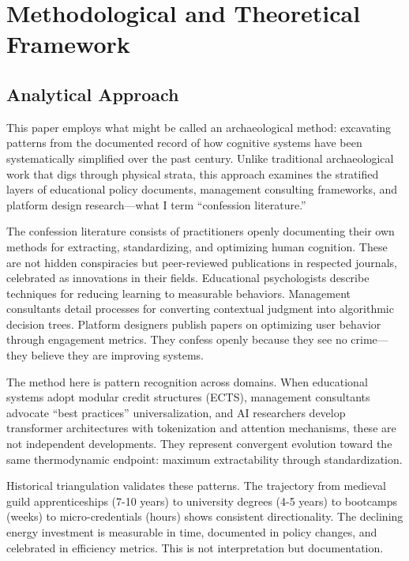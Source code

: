 \section{Methodological and Theoretical Framework}

\subsection{Analytical Approach}

This paper employs what might be called an archaeological method: excavating patterns from the documented record of how cognitive systems have been systematically simplified over the past century. Unlike traditional archaeological work that digs through physical strata, this approach examines the stratified layers of educational policy documents, management consulting frameworks, and platform design research---what I term ``confession literature.''

The confession literature consists of practitioners openly documenting their own methods for extracting, standardizing, and optimizing human cognition. These are not hidden conspiracies but peer-reviewed publications in respected journals, celebrated as innovations in their fields. Educational psychologists describe techniques for reducing learning to measurable behaviors. Management consultants detail processes for converting contextual judgment into algorithmic decision trees. Platform designers publish papers on optimizing user behavior through engagement metrics. They confess openly because they see no crime---they believe they are improving systems.

The method here is pattern recognition across domains. When educational systems adopt modular credit structures (ECTS), management consultants advocate ``best practices'' universalization, and AI researchers develop transformer architectures with tokenization and attention mechanisms, these are not independent developments. They represent convergent evolution toward the same thermodynamic endpoint: maximum extractability through standardization.

Historical triangulation validates these patterns. The trajectory from medieval guild apprenticeships (7-10 years) to university degrees (4-5 years) to bootcamps (weeks) to micro-credentials (hours) shows consistent directionality. The declining energy investment is measurable in time, documented in policy changes, and celebrated in efficiency metrics. This is not interpretation but documentation.

